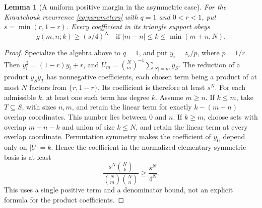 \documentclass[11pt]{article}
\newtheorem{lemma}[theorem]{Lemma}
\begin{document}
\begin{lemma}[A uniform positive margin in the asymmetric case]\label{lem:margin}
For the Krawtchouk recurrence \eqref{eq:parameters} with $q=1$ and $0<r<1$, put $s=\min(r,1-r)$. Every coefficient in its triangle support obeys
\begin{equation}\label{eq:margin}
g(m,n;k)\geq (s/4)^N\quad\text{if }|m-n|\leq k\leq\min(m+n,N).
\end{equation}
\end{lemma}
\begin{proof}
Specialize the algebra above to $q=1$, and put $y_i=z_i/p$, where $p=1/r$. Then $y_i^2=(1-r)y_i+r$, and $U_m=\binom Nm^{-1}\sum_{|S|=m}y_S$. The reduction of a product $y_Sy_T$ has nonnegative coefficients, each chosen term being a product of at most $N$ factors from $\{r,1-r\}$. Its coefficient is therefore at least $s^N$.
For each admissible $k$, at least one such term has degree $k$. Assume $m\geq n$. If $k\leq m$, take $T\subseteq S$, with sizes $n,m$, and retain the linear term for exactly $k-(m-n)$ overlap coordinates. This number lies between $0$ and $n$. If $k\geq m$, choose sets with overlap $m+n-k$ and union of size $k\leq N$, and retain the linear term at every overlap coordinate.
Permutation symmetry makes the coefficient of $y_U$ depend only on $|U|=k$. Hence the coefficient in the normalized elementary-symmetric basis is at least
\[
\frac{s^N\binom Nk}{\binom Nm\binom Nn}\geq\frac{s^N}{4^N}.
\]
This uses a single positive term and a denominator bound, not an explicit formula for the product coefficients.
\end{proof}
\end{document}
